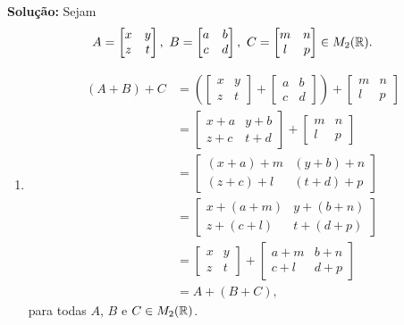 \documentclass[12pt]{exam}
\begin{document}
\noindent\textbf{Solu\c{c}\~ao:} Sejam
\[
    A = \begin{bmatrix}
        x & y\\
        z & t
    \end{bmatrix},\ 
    B = \begin{bmatrix}
        a & b\\
        c & d
    \end{bmatrix},\ 
    C = \begin{bmatrix}
        m & n\\
        l & p
    \end{bmatrix} \in M_2(\real).
\]
\begin{enumerate}[label={\roman*})]
    \item
    \begin{align*}
        (A + B) + C &= \left(\begin{bmatrix}
        x & y\\z & t 
    \end{bmatrix} + \begin{bmatrix}
        a & b\\c & d 
    \end{bmatrix}\right) + \begin{bmatrix}
        m & n\\l & p 
    \end{bmatrix}\\ &= \begin{bmatrix}
        x + a & y + b\\z + c & t + d 
    \end{bmatrix} + \begin{bmatrix}
        m & n\\l & p 
    \end{bmatrix}\\ &= \begin{bmatrix}
        (x + a) + m & (y + b) + n\\(z + c) + l & (t + d) + p 
    \end{bmatrix}\\ &= \begin{bmatrix}
        x + (a + m) & y + (b + n)\\z + (c + l) & t + (d + p) 
    \end{bmatrix} \\&= \begin{bmatrix}
        x & y\\
        z & t
    \end{bmatrix} + \begin{bmatrix}
        a + m & b + n\\c + l & d + p 
    \end{bmatrix}\\ &= A + (B + C),
    \end{align*}
    para todas $A$, $B$ e $C \in M_2(\mathbb{R})$.


\end{enumerate}
\end{document}
